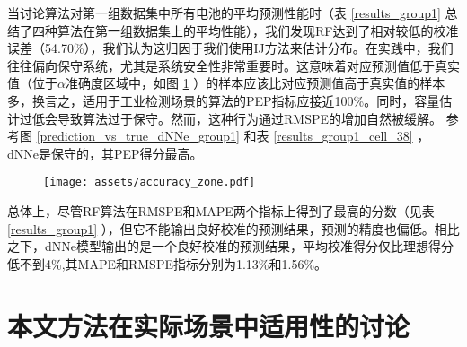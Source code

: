 \documentclass{article}
\begin{document}
\begin{table}[h!]
\centering
{}
\caption{第一组数据的平均预测性能}
\label{results_group1}
\end{table}

当讨论算法对第一组数据集中所有电池的平均预测性能时（表 \ref{results_group1} 总结了四种算法在第一组数据集上的平均性能），我们发现RF达到了相对较低的校准误差（54.70\%），我们认为这归因于我们使用IJ方法来估计分布。在实践中，我们往往偏向保守系统，尤其是系统安全性非常重要时。这意味着对应预测值低于真实值（位于$\alpha$准确度区域中，如图 \ref{accuracy_zone} ）的样本应该比对应预测值高于真实值的样本多，换言之，适用于工业检测场景的算法的PEP指标应接近100\%。同时，容量估计过低会导致算法过于保守。然而，这种行为通过RMSPE的增加自然被缓解。
参考图 \ref{prediction_vs_true_dNNe_group1} 和表 \ref{results_group1_cell_38} ，dNNe是保守的，其PEP得分最高。

\begin{figure}[h!]
    \centering
    \texttt{[image: assets/accuracy\_zone.pdf]}
    \label{accuracy_zone}
\end{figure}

总体上，尽管RF算法在RMSPE和MAPE两个指标上得到了最高的分数（见表 \ref{results_group1} ），但它不能输出良好校准的预测结果，预测的精度也偏低。相比之下，dNNe模型输出的是一个良好校准的预测结果，平均校准得分仅比理想得分低不到4\%,其MAPE和RMSPE指标分别为1.13\%和1.56\%。

\section{本文方法在实际场景中适用性的讨论}
\end{document}
